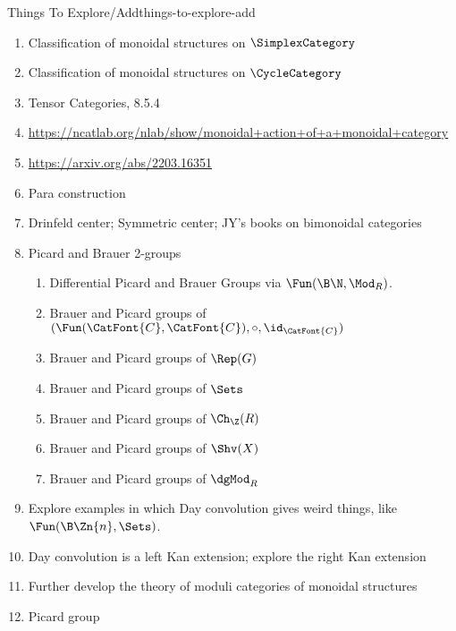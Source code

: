 \begin{remark}{Things To Explore/Add}{things-to-explore-add}
\begin{enumerate}
            \begin{enumerate}
                \item Composition
                \item Pointwise product
                \item Day convolution
                \item Relative monad version of Day convolution
            \end{enumerate}
        \item Classification of monoidal structures on $\SimplexCategory$
        \item Classification of monoidal structures on $\CycleCategory$
        \item Tensor Categories, 8.5.4
        \item \url{https://ncatlab.org/nlab/show/monoidal+action+of+a+monoidal+category}
        \item \url{https://arxiv.org/abs/2203.16351}
        \item Para construction
        \item Drinfeld center; Symmetric center; JY's books on bimonoidal categories
        \item Picard and Brauer 2-groups
            \begin{enumerate}
                \item Differential Picard and Brauer Groups via $\Fun(\B\N,\Mod_{R})$.
                \item Brauer and Picard groups of $(\Fun(\CatFont{C},\CatFont{C}),\circ,\id_{\CatFont{C}})$
                \item Brauer and Picard groups of $\Rep(G)$
                \item Brauer and Picard groups of $\Sets$
                \item Brauer and Picard groups of $\Ch_{\Z}(R)$
                \item Brauer and Picard groups of $\Shv(X)$
                \item Brauer and Picard groups of $\dgMod_{R}$
            \end{enumerate}
        \item Explore examples in which Day convolution gives weird things, like $\Fun(\B\Zn{n},\Sets)$.
        \item Day convolution is a left Kan extension; explore the right Kan extension
        \item Further develop the theory of moduli categories of monoidal structures
        \item Picard group

\end{enumerate}
\end{remark}
